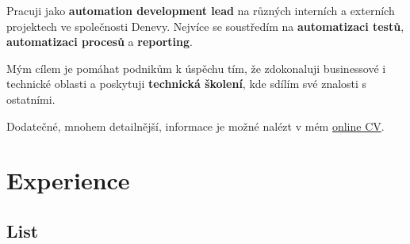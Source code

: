 \documentclass[cv_cz.tex]{subfiles}
\begin{document}

\newcommand\minitab[2][l]{\begin{tabular}[b]{#1}#2\end{tabular}}
\newcommand\tnode[2][left]{\tikz[baseline=(n.center)]\node(n)[inner sep=0,outer sep=0,align=#1]{#2};}
\newcommand*{\cventrylogo}[8][.25em]{
  \begin{tabular*}{\textwidth}{l@{\extracolsep{\fill}}r}%
    \tnode{\minitab[l]{
      {\bfseries #4} \\ {\itshape #3\ifthenelse{\equal{#7}{}}{}{, #7}}
    }}
    & 
    \tnode[right]{\minitab[r]{{\bfseries #6} \\ {\itshape #2} \\ #5}} 
      \\%
  \end{tabular*}%
  \ifx&#8&%
    \else{\\\vbox{\small#8}}\fi%
  \par\addvspace{#1}}


\vspace*{-8mm}

Pracuji jako \textbf{automation development lead} na různých interních a externích projektech ve společnosti Denevy. Nejvíce se soustředím na \textbf{automatizaci testů}, \textbf{automatizaci procesů} a \textbf{reporting}. \\

\vspace*{-3mm}

Mým cílem je pomáhat podnikům k úspěchu tím, že zdokonaluji businessové i technické oblasti a poskytuji \textbf{technická školení}, kde sdílím své znalosti s ostatními. \\

\vspace*{-3mm}

Dodatečné, mnohem detailnější, informace je možné nalézt v mém \href{https://dominik-97.github.io/curriculum-vitae/index_cz.html}{\color[RGB]{69,114,174}online CV}.

\section{Experience}
\subsection{List}

\end{document}
